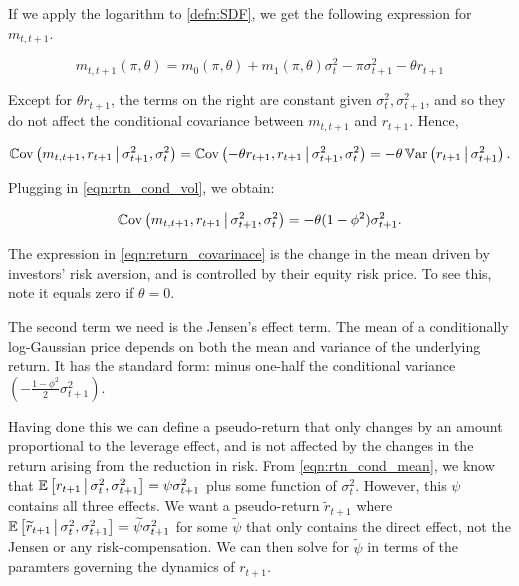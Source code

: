 \documentclass[11pt, letterpaper, twoside, final]{article}
\begin{document}
If we apply the logarithm to \cref{defn:SDF}, we get the following expression for $m_{t,t+1}$.

\begin{equation}
    \label{eqn:log_sdf}
        m_{t,t+1}(\pi, \theta) = m_{0}(\pi, \theta) + m_1(\pi, \theta) \sigma_t^2 - \pi \sigma^2_{t+1} - \theta
        r_{t+1}
\end{equation}

Except for $\theta r_{t+1}$, the terms on the right are constant given $\sigma^2_t, \sigma^2_{t+1}$, and so they
do not affect the conditional covariance between $m_{t,t+1}$ and $r_{t+1}$.
Hence,

\begin{equation}
    \Cov\left(m_{t,t+1}, r_{t+1} \mvert \sigma^2_{t+1}, \sigma^2_t \right)   
%
    = \Cov\left(-\theta r_{t+1}, r_{t+1} \mvert \sigma^2_{t+1}, \sigma^2_t \right)   
%
    = -\theta \Var\left(r_{t+1} \mvert \sigma^2_{t+1}\right).   
\end{equation}

\noindent Plugging in \cref{eqn:rtn_cond_vol}, we obtain:

\begin{equation}
    \label{eqn:return_covarinace}
    \Cov\left(m_{t,t+1}, r_{t+1} \mvert \sigma^2_{t+1}, \sigma^2_t \right)   
%
    = -\theta (1 - \phi^2) \sigma^2_{t+1}.
\end{equation}

The expression in \cref{eqn:return_covarinace} is the change in the mean driven by investors' risk aversion, and
is controlled by their equity risk price.
To see this, note it equals zero if $\theta = 0$.

The second term we need is the Jensen's effect term.
The mean of a conditionally log-Gaussian price depends on both the mean and variance of the underlying return.
It has the standard form: minus one-half the conditional variance $\left(-\frac{1 - \phi^2}{2}
\sigma^2_{t+1}\right)$. 

Having done this we can define a pseudo-return that only changes by an amount proportional to the leverage
effect, and is not affected by the changes in the return arising from the reduction in risk.
From \cref{eqn:rtn_cond_mean}, we know that $\operatorname{\mathbb{E}}\left[r_{t+1} \,\middle\vert\, \sigma^2_t, \sigma^2_{t+1} \right] = \psi
\sigma^2_{t+1}$ plus some function  of $\sigma^2_t$.
However, this $\psi$ contains all three effects.
We want a pseudo-return $\widetilde{r}_{t+1}$ where $\operatorname{\mathbb{E}}\left[\widetilde{r}_{t+1} \,\middle\vert\, \sigma^2_t, \sigma^2_{t+1}
\right] = \widetilde{\psi} \sigma^2_{t+1}$ for some $\widetilde{\psi}$ that only contains the direct effect, not
the Jensen or any risk-compensation.
We can then solve for $\widetilde{\psi}$ in terms of the paramters governing the dynamics of $r_{t+1}$.
\end{document}
